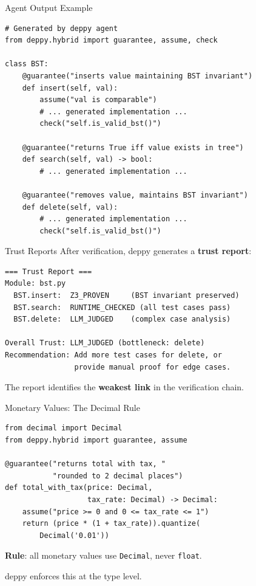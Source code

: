 \documentclass[aspectratio=169,11pt]{beamer}
\begin{document}
\begin{frame}{Agent Output Example}
\begin{lstlisting}[language=deppy, basicstyle=\tiny\ttfamily]
# Generated by deppy agent
from deppy.hybrid import guarantee, assume, check

class BST:
    @guarantee("inserts value maintaining BST invariant")
    def insert(self, val):
        assume("val is comparable")
        # ... generated implementation ...
        check("self.is_valid_bst()")

    @guarantee("returns True iff value exists in tree")
    def search(self, val) -> bool:
        # ... generated implementation ...

    @guarantee("removes value, maintains BST invariant")
    def delete(self, val):
        # ... generated implementation ...
        check("self.is_valid_bst()")
\end{lstlisting}
\end{frame}

\begin{frame}{Trust Reports}
After verification, deppy generates a \textbf{trust report}:

\begin{lstlisting}[basicstyle=\tiny\ttfamily]
=== Trust Report ===
Module: bst.py
  BST.insert:  Z3_PROVEN     (BST invariant preserved)
  BST.search:  RUNTIME_CHECKED (all test cases pass)
  BST.delete:  LLM_JUDGED    (complex case analysis)

Overall Trust: LLM_JUDGED (bottleneck: delete)
Recommendation: Add more test cases for delete, or
                provide manual proof for edge cases.
\end{lstlisting}

\vspace{0.3em}
The report identifies the \textbf{weakest link} in the verification chain.
\end{frame}

\begin{frame}{Monetary Values: The Decimal Rule}
\begin{lstlisting}[language=deppy]
from decimal import Decimal
from deppy.hybrid import guarantee, assume

@guarantee("returns total with tax, "
           "rounded to 2 decimal places")
def total_with_tax(price: Decimal,
                   tax_rate: Decimal) -> Decimal:
    assume("price >= 0 and 0 <= tax_rate <= 1")
    return (price * (1 + tax_rate)).quantize(
        Decimal('0.01'))
\end{lstlisting}

\vspace{0.3em}
\textbf{Rule}: all monetary values use \texttt{Decimal}, never \texttt{float}.

deppy enforces this at the type level.
\end{frame}
\end{document}

